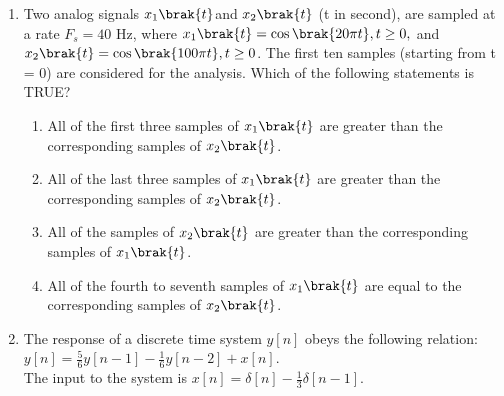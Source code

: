 \begin{enumerate}[label=\thesubsection.\arabic*,ref=\thesubsection.\theenumi]
\begin{multicols}{4}
	\begin{enumerate}
		\item $\frac{e^{-2s}}{s^2\brak{s-2}}$
		\item $\frac{e^{-2\brak{s-2}}}{s^3}$
		\item $\frac{se^{-2s}}{\brak{s-2}^2}$
		\item $ \frac{e^{-2s}}{s^3}$
	\end{enumerate}
\end{multicols}
\item Two analog signals $x_1\brak{t}$and $x_2\brak{t}$ (t in second), are sampled at a rate
$F_s = 40$ Hz, where
$x_1 \brak{t} = \cos \brak{20\pi t},t\geq0,$ and $x_2 \brak{t} = \cos \brak{100\pi t}, t\geq0$.
The first ten samples (starting from t = 0) are considered for the analysis.
Which of the following statements is TRUE? 
	\begin{enumerate}
		\item All of the first three samples of $x_1\brak{t}$ are greater than the corresponding samples of $x_2 \brak{t}$. 
		\item All of the last three samples of $x_1\brak{t}$ are greater than the corresponding samples of $x_2 \brak{t}$. 
		\item All of the samples of $x_2\brak{t}$ are greater than the corresponding samples of $x_1 \brak{t}$.
		\item All of the fourth to seventh samples of $x_1\brak{t}$ are equal to the corresponding samples of $x_2 \brak{t}$.
	\end{enumerate}
\item The response of a discrete time system $y[n]$ obeys the following relation:\\
$y[n] =\frac{5}{6} y[n-1]-\frac{1}{6}y[n-2] +x[n]$.\\
The input to the system is $x[n] = \delta[n] - \frac{1}{3}\delta[n-1]$.


\end{enumerate}
